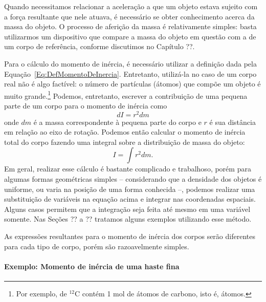 Quando necessitamos relacionar a aceleração a que um objeto estava sujeito com a força resultante que nele atuava, é necessário se obter conhecimento acerca da massa do objeto. O processo de aferição da massa é relativamente simples: basta utilizarmos um dispositivo que compare a massa do objeto em questão com a de um corpo de referência, conforme discutimos no Capítulo ??.

Para o cálculo do momento de inércia, é necessário utilizar a definição dada pela Equação~\ref{Eq:DefMomentoDeInercia}. Entretanto, utilizá-la no caso de um corpo real não é algo factível: o número de partículas (átomos) que compõe um objeto é muito grande.\footnote{Por exemplo,  de $^{12}\textrm{C}$ contém 1 mol de átomos de carbono, isto é,  átomos.} Podemos, entretanto, escrever a contribuição de uma pequena parte de um corpo para o momento de inércia como
\begin{equation}
	dI = r^2 dm
\end{equation}
onde $dm$ é a massa correspondente à pequena parte do corpo e $r$ é sua distância em relação ao eixo de rotação. Podemos então calcular o momento de inércia total do corpo fazendo uma integral sobre a distribuição de massa do objeto:
\begin{equation}\label{Eq:MomInerciaIntegral}
	I = \int r^2 dm.
\end{equation}
%
Em geral, realizar esse cálculo é bastante complicado e trabalhoso, porém para algumas formas geométricas simples -- considerando que a densidade dos objetos é uniforme, ou varia na posição de uma forma conhecida --, podemos realizar uma substituição de variáveis na equação acima e integrar nas coordenadas espaciais. Alguns casos permitem que a integração seja feita até mesmo em uma variável somente. Nas Seções ?? a ?? tratamos alguns exemplos utilizando esse método.

As expressões resultantes para o momento de inércia dos corpos serão diferentes para cada tipo de corpo, porém são razoavelmente simples.

\paragraph{Exemplo: Momento de inércia de uma haste fina}

